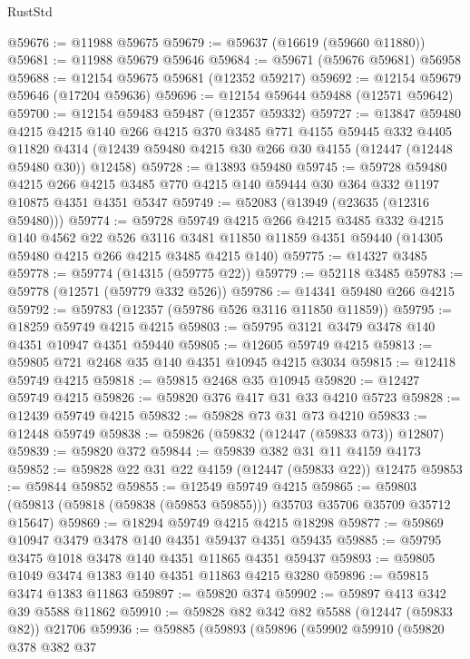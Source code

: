 \begin{lexlean}{RustStd}
\begin{coremodule}
@59676 := @11988 @59675
@59679 := @59637 (@16619 (@59660 @11880))
@59681 := @11988 @59679 @59646
@59684 := @59671 (@59676 @59681) @56958
@59688 := @12154 @59675 @59681 (@12352 @59217)
@59692 := @12154 @59679 @59646 (@17204 @59636)
@59696 := @12154 @59644 @59488 (@12571 @59642)
@59700 := @12154 @59483 @59487 (@12357 @59332)
@59727 := @13847
    @59480
    @4215
    @4215
    @140
    @266
    @4215
    @370
    @3485
    @771
    @4155
    @59445
    @332
    @4405
    @11820
    @4314
    (@12439 @59480 @4215 @30 @266 @30 @4155 (@12447 (@12448 @59480 @30)) @12458)
@59728 := @13893 @59480
@59745 := @59728
    @59480
    @4215
    @266
    @4215
    @3485
    @770
    @4215
    @140
    @59444
    @30
    @364
    @332
    @1197
    @10875
    @4351
    @4351
    @5347
@59749 := @52083 (@13949 (@23635 (@12316 @59480)))
@59774 := @59728
    @59749
    @4215
    @266
    @4215
    @3485
    @332
    @4215
    @140
    @4562
    @22
    @526
    @3116
    @3481
    @11850
    @11859
    @4351
    @59440
    (@14305 @59480 @4215 @266 @4215 @3485 @4215 @140)
@59775 := @14327 @3485
@59778 := @59774 (@14315 (@59775 @22))
@59779 := @52118 @3485
@59783 := @59778 (@12571 (@59779 @332 @526))
@59786 := @14341 @59480 @266 @4215
@59792 := @59783 (@12357 (@59786 @526 @3116 @11850 @11859))
@59795 := @18259 @59749 @4215 @4215
@59803 := @59795 @3121 @3479 @3478 @140 @4351 @10947 @4351 @59440
@59805 := @12605 @59749 @4215
@59813 := @59805 @721 @2468 @35 @140 @4351 @10945 @4215 @3034
@59815 := @12418 @59749 @4215
@59818 := @59815 @2468 @35 @10945
@59820 := @12427 @59749 @4215
@59826 := @59820 @376 @417 @31 @33 @4210 @5723
@59828 := @12439 @59749 @4215
@59832 := @59828 @73 @31 @73 @4210
@59833 := @12448 @59749
@59838 := @59826 (@59832 (@12447 (@59833 @73)) @12807)
@59839 := @59820 @372
@59844 := @59839 @382 @31 @11 @4159 @4173
@59852 := @59828 @22 @31 @22 @4159 (@12447 (@59833 @22)) @12475
@59853 := @59844 @59852
@59855 := @12549 @59749 @4215
@59865 := @59803 (@59813 (@59818 (@59838 (@59853 @59855))) @35703 @35706 @35709 @35712 @15647)
@59869 := @18294 @59749 @4215 @4215 @18298
@59877 := @59869 @10947 @3479 @3478 @140 @4351 @59437 @4351 @59435
@59885 := @59795 @3475 @1018 @3478 @140 @4351 @11865 @4351 @59437
@59893 := @59805 @1049 @3474 @1383 @140 @4351 @11863 @4215 @3280
@59896 := @59815 @3474 @1383 @11863
@59897 := @59820 @374
@59902 := @59897 @413 @342 @39 @5588 @11862
@59910 := @59828 @82 @342 @82 @5588 (@12447 (@59833 @82)) @21706
@59936 := @59885
    (@59893
      (@59896
        (@59902
          @59910
          (@59820
            @378
            @382
            @37

\end{coremodule}
\end{lexlean}
